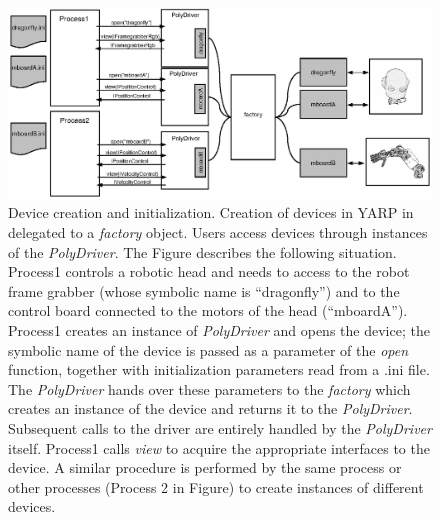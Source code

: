 %
%

\begin{figure}[tbp]
\centerline{
\includegraphics[width=20cm]{fig-devices4}
}
\caption{Device creation and initialization. Creation of 
devices in YARP in delegated to a \emph{factory} object. Users 
access devices through instances of the \emph{PolyDriver}. The 
Figure describes the following situation. Process1 controls a robotic
head and needs to access to the robot frame grabber (whose symbolic name 
is ``dragonfly'') and to the control board connected to the motors of 
the head (``mboardA''). Process1 creates an instance of 
\emph{PolyDriver} and opens 
the device; the symbolic name of the device is passed as a parameter
of the \emph{open} function, together with initialization parameters 
read from a .ini file. The \emph{PolyDriver} hands over these parameters 
to the \emph{factory} which creates an instance of the device and returns
it to the \emph{PolyDriver}. Subsequent calls to the driver are entirely 
handled by the \emph{PolyDriver} itself. Process1 calls \emph{view} to 
acquire the appropriate interfaces to the device. A similar procedure 
is performed by the same process or other processes (Process 2 in Figure) 
to create instances of different devices.}\label{fig:devices4}
\end{figure}


